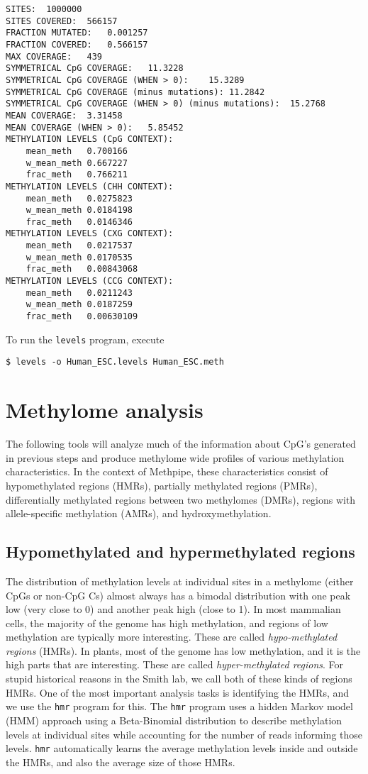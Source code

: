 \documentclass[10pt]{article}
\newcommand{\prog}[1]{\texttt{#1}}
\begin{document}
\begin{verbatim}
SITES:	1000000
SITES COVERED:	566157
FRACTION MUTATED:	0.001257
FRACTION COVERED:	0.566157
MAX COVERAGE:	439
SYMMETRICAL CpG COVERAGE:	11.3228
SYMMETRICAL CpG COVERAGE (WHEN > 0):	15.3289
SYMMETRICAL CpG COVERAGE (minus mutations):	11.2842
SYMMETRICAL CpG COVERAGE (WHEN > 0) (minus mutations):	15.2768
MEAN COVERAGE:	3.31458
MEAN COVERAGE (WHEN > 0):	5.85452
METHYLATION LEVELS (CpG CONTEXT):
	mean_meth	0.700166
	w_mean_meth	0.667227
	frac_meth	0.766211	
METHYLATION LEVELS (CHH CONTEXT):
	mean_meth	0.0275823
	w_mean_meth	0.0184198
	frac_meth	0.0146346	
METHYLATION LEVELS (CXG CONTEXT):
	mean_meth	0.0217537
	w_mean_meth	0.0170535
	frac_meth	0.00843068	
METHYLATION LEVELS (CCG CONTEXT):
	mean_meth	0.0211243
	w_mean_meth	0.0187259
	frac_meth	0.00630109
\end{verbatim}

To run the \prog{levels} program, execute

\begin{verbatim}
$ levels -o Human_ESC.levels Human_ESC.meth
\end{verbatim}

\section{Methylome analysis}
\label{sec:high-level-analys}

The following tools will analyze much of the information about CpG's
generated in previous steps and produce methylome wide profiles of
various methylation characteristics. In the context of Methpipe, these
characteristics consist of hypomethylated regions (HMRs), partially
methylated regions (PMRs), differentially methylated regions between
two methylomes (DMRs), regions with allele-specific methylation (AMRs),
and hydroxymethylation.

\subsection{Hypomethylated and hypermethylated regions}
\label{sec:indent-hypo-methyl}

The distribution of methylation levels at individual sites in a
methylome (either CpGs or non-CpG Cs) almost always has a bimodal
distribution with one peak low (very close to 0) and another peak high
(close to 1). In most mammalian cells, the majority of the genome has
high methylation, and regions of low methylation are typically more
interesting. These are called {\em hypo-methylated regions} (HMRs). In
plants, most of the genome has low methylation, and it is the high
parts that are interesting. These are called {\em hyper-methylated
  regions}. For stupid historical reasons in the Smith lab, we call
both of these kinds of regions HMRs. One of the most important
analysis tasks is identifying the HMRs, and we use the \prog{hmr}
program for this. The \prog{hmr} program uses a hidden Markov model
(HMM) approach using a Beta-Binomial distribution to describe
methylation levels at individual sites while accounting for the number
of reads informing those levels. \prog{hmr} automatically learns the
average methylation levels inside and outside the HMRs, and also the
average size of those HMRs.
\end{document}

